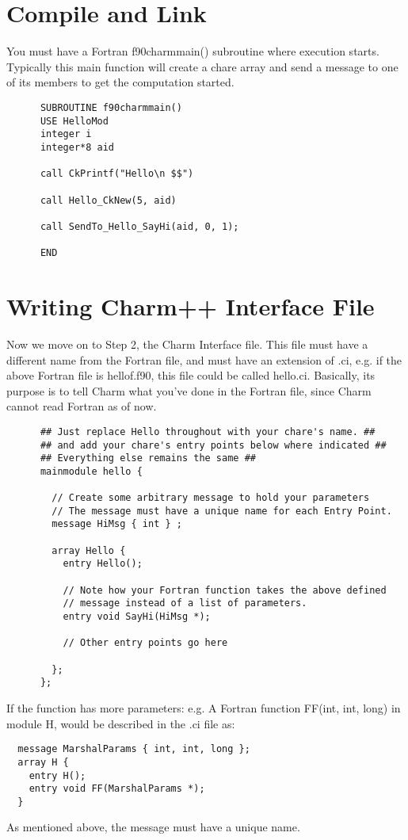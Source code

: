 \documentclass[11pt]{article}
\begin{document}
\section{Compile and Link}
You must have a Fortran f90charmmain() subroutine where execution starts.
Typically this main function will create a chare array and send a
message to one of its members to get the computation started.
\begin{verbatim}
      SUBROUTINE f90charmmain()
      USE HelloMod
      integer i
      integer*8 aid

      call CkPrintf("Hello\n $$")

      call Hello_CkNew(5, aid)

      call SendTo_Hello_SayHi(aid, 0, 1);

      END
\end{verbatim}
\section{Writing Charm++ Interface File}
Now we move on to Step 2, the Charm Interface file.  This file must
have a different name from the Fortran file, and must have an
extension of .ci, e.g. if the above Fortran file is hellof.f90, this
file could be called hello.ci.  Basically, its purpose is to tell
Charm what you've done in the Fortran file, since Charm cannot read
Fortran as of now.
\begin{verbatim}
      ## Just replace Hello throughout with your chare's name. ##
      ## and add your chare's entry points below where indicated ##
      ## Everything else remains the same ##
      mainmodule hello {
      
        // Create some arbitrary message to hold your parameters
        // The message must have a unique name for each Entry Point.
        message HiMsg { int } ;
      
        array Hello {
          entry Hello();

          // Note how your Fortran function takes the above defined
          // message instead of a list of parameters.
          entry void SayHi(HiMsg *);

          // Other entry points go here

        };              
      };
\end{verbatim}
If the function has more parameters: e.g. A Fortran function FF(int,
int, long) in module H, would be described in the .ci file as:
\begin{verbatim}
  message MarshalParams { int, int, long };
  array H {
    entry H();
    entry void FF(MarshalParams *);
  }
\end{verbatim}
As mentioned above, the message must have a unique name.
\end{document}
